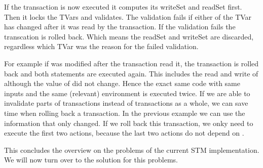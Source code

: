 If the transaction is now executed it computes its writeSet and readSet first. Then it locks the TVars and 
validates. The validation fails if either of the TVar has changed after it was read by the transaction.
If the validation fails the transcation is rolled back. Which means the readSet and writeSet are discarded,
regardless which TVar was the reason for the failed validation. 

For example if  was modified after the transaction read it, the transaction is rolled back and both 
statements are executed again. This includes the read and write of  although the value of 
 did not change. Hence the exact same code with same inputs and the same (relevant) environment is 
executed twice. If we are able to invalidate parts of transactions instead of transactions as a whole, 
we can save time when rolling back a transaction.  
In the previous example we can use the information that only  changed. If we roll back this 
transaction, we onky need to execute the first two actions, because the last two actions do not depend 
on .



This concludes the overview on the problems of the current STM implementation. We will now turn over to the 
solution for this problems.







% 
% 

